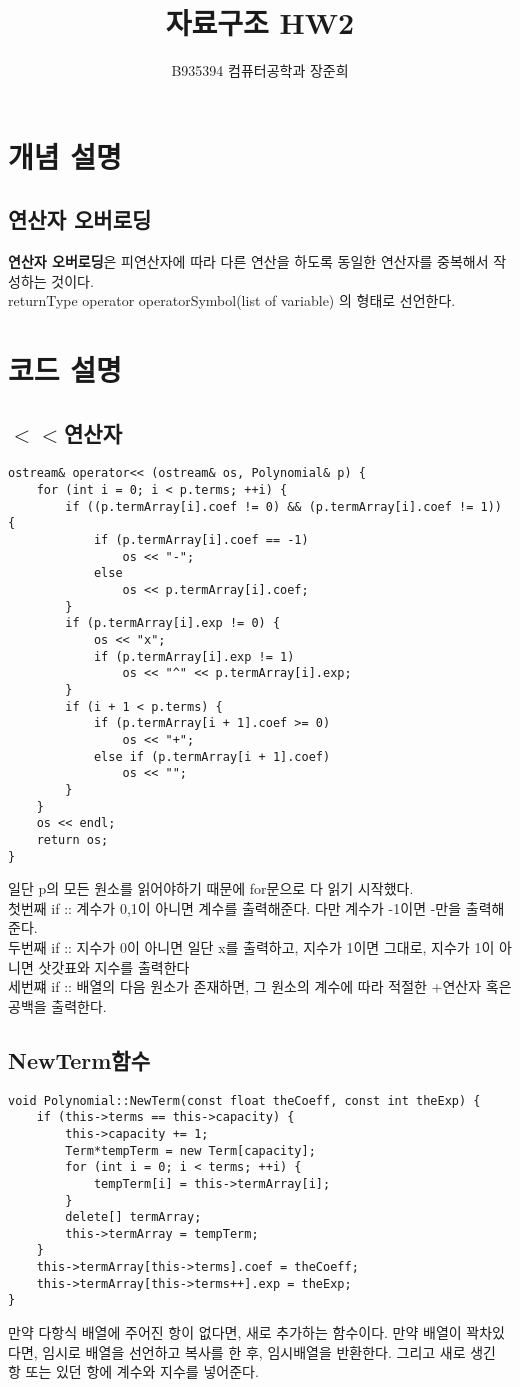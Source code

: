 \documentclass[a4paper,11pt]{article}
\begin{document}
\title{자료구조 HW2}
\author{B935394 컴퓨터공학과 장준희}
\maketitle
\newpage
\section{개념 설명}
\subsection{연산자 오버로딩}
\textbf{연산자 오버로딩}은 피연산자에 따라 다른 연산을 하도록 동일한 연산자를 중복해서 작성하는 것이다.\\ 
returnType operator operatorSymbol(list of variable) 의 형태로 선언한다.

\section{코드 설명}
\subsection{$<<$연산자}
\begin{Verbatim}
ostream& operator<< (ostream& os, Polynomial& p) {
	for (int i = 0; i < p.terms; ++i) {
		if ((p.termArray[i].coef != 0) && (p.termArray[i].coef != 1)) {
			if (p.termArray[i].coef == -1)
				os << "-";
			else
				os << p.termArray[i].coef;
		}
		if (p.termArray[i].exp != 0) {
			os << "x";
			if (p.termArray[i].exp != 1)
				os << "^" << p.termArray[i].exp;
		}
		if (i + 1 < p.terms) {
			if (p.termArray[i + 1].coef >= 0)
				os << "+";
			else if (p.termArray[i + 1].coef)
				os << "";
		}
	}
	os << endl;
	return os;
}

\end{Verbatim}
일단 p의 모든 원소를 읽어야하기 때문에 for문으로 다 읽기 시작했다.\\ 첫번째 if :: 계수가 0,1이 아니면 계수를 출력해준다. 다만 계수가 -1이면 -만을 출력해준다.\\
두번째 if :: 지수가 0이 아니면 일단 x를 출력하고, 지수가 1이면 그대로, 지수가 1이 아니면 삿갓표와 지수를 출력한다\\
세번쨰 if :: 배열의 다음 원소가 존재하면, 그 원소의 계수에 따라 적절한 +연산자 혹은 공백을 출력한다.
\subsection{NewTerm함수}
\begin{Verbatim}
void Polynomial::NewTerm(const float theCoeff, const int theExp) {
	if (this->terms == this->capacity) {
		this->capacity += 1;
		Term*tempTerm = new Term[capacity];
		for (int i = 0; i < terms; ++i) {
			tempTerm[i] = this->termArray[i];
		}
		delete[] termArray;
		this->termArray = tempTerm;
	}
	this->termArray[this->terms].coef = theCoeff;
	this->termArray[this->terms++].exp = theExp;
}
\end{Verbatim}
만약 다항식 배열에 주어진 항이 없다면, 새로 추가하는 함수이다. 만약 배열이 꽉차있다면, 임시로 배열을 선언하고 복사를 한 후, 임시배열을 반환한다. 그리고 새로 생긴 항 또는 있던 항에 계수와 지수를 넣어준다.
\end{document}
